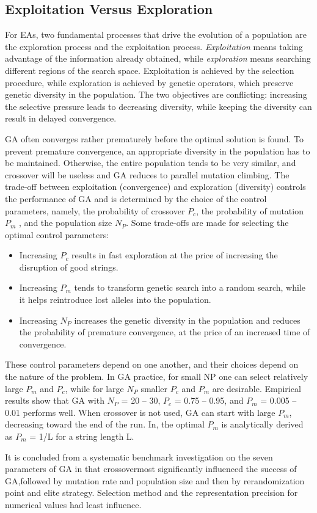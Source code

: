 \documentclass[14pt]{article}
\numberwithin{equation}{subsection}
\begin{document}
		\subsection{Exploitation Versus Exploration}For EAs, two fundamental processes that drive the evolution of a
		population are the exploration process and the exploitation process. \textit{Exploitation} means taking
		advantage of the information already obtained, while \textit{exploration} means searching different regions of
		the	search space.	Exploitation is achieved by the selection procedure, while exploration is achieved by genetic
		operators, which preserve genetic diversity in the population. The two objectives are conflicting: increasing
		the selective	pressure leads to decreasing diversity, while keeping the diversity can result in delayed
		convergence. \par
		GA often converges rather prematurely before the optimal solution is found. To prevent premature convergence,
		an appropriate diversity in the population has to be maintained. Otherwise, the entire population tends to be
		very similar, and crossover will be useless and GA reduces to parallel mutation climbing. The trade-off between
		exploitation (convergence) and exploration (diversity) controls the performance of GA and is determined by the
		choice of the control parameters, namely, the probability of crossover $P_c$, the probability of mutation $P_m$
		, and	the population size $N_P$. Some trade-offs are made for selecting the optimal control parameters:
		
		\begin{itemize}
			\item Increasing $P_c$ results in fast exploration at the price of increasing the disruption of good strings.
			\item  Increasing $P_m$ tends to transform genetic search into a random search, while it helps reintroduce lost
			alleles into the population.
			\item Increasing $N_P$ increases the genetic diversity in the population and reduces the probability of
			premature convergence, at the price of an increased time of convergence.
		\end{itemize}
		
		These control parameters depend on one another, and their choices depend on the nature of the problem. In GA
		practice, for small NP one can select relatively large $P_m$ and $P_c$, while for large $N_P$ smaller $P_c$ and
		$P_m$ are desirable. Empirical results show that GA with $N_P$ = 20 – 30, $P_c$ = 0.75 – 0.95, and 
		$P_m$ = 0.005 – 0.01 performs well. When crossover is not used, GA can start with large $P_m$, decreasing toward
		the end of the run. In, the optimal $P_m$ is analytically derived as $P_m$ = 1/L for a string length L. \par
		It is concluded from a systematic benchmark investigation on the seven parameters of GA in that crossovermost
		significantly influenced the success of GA,followed by mutation rate and population size and then by
		rerandomization point and elite strategy. Selection method and the representation precision for numerical
		values had least influence.
\end{document}
